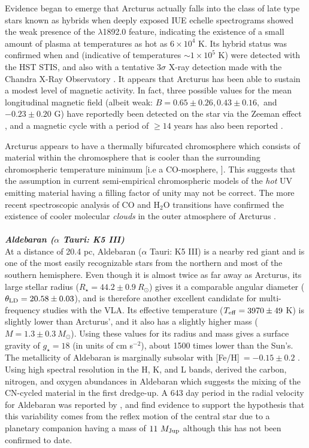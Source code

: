 Evidence began to emerge that Arcturus actually falls into the class of late type stars known as hybrids when deeply exposed IUE echelle spectrograms showed the weak presence of the \ion{Si}{iii]} $\lambda$1892.0 feature, indicating the existence of a small amount of plasma at temperatures as hot as $6 \times 10^4$ K. Its hybrid status was confirmed when  and  (indicative of temperatures $\sim 1 \times 10^5$ K) were detected with the HST STIS, and also with a tentative $3 \sigma$ X-ray detection made with the  Chandra X-Ray Observatory \citep{ayres_2003}. It appears that Arcturus has been able to sustain a modest level of magnetic activity. In fact, three possible values for the mean longitudinal magnetic field (albeit weak: $B = 0.65 \pm 0.26, 0.43 \pm 0.16,$ and $-0.23 \pm 0.20$ G) have reportedly been detected on the star via the Zeeman effect \citep{sennhauser_2011}, and a magnetic cycle with a period of $\geq 14$ years has also been reported \citep{brown_2008}.

Arcturus appears to have a thermally bifurcated chromosphere which consists of material within the chromosphere that is cooler than the surrounding chromospheric temperature minimum [i.e a CO-mosphere, \cite{wiedemann_1994}]. This suggests that the assumption in current semi-empirical chromospheric models of the \textit{hot} UV emitting material having a filling factor of unity may not be correct. The more recent spectroscopic analysis of CO and H$_{2}$O transitions have confirmed the existence of cooler molecular \textit{clouds} in the outer atmosphere of Arcturus \citep{ryde_2002,tsuji_2009}. 
\\
\\
\textbf{\textit{Aldebaran ($\alpha$ Tauri: K5 III)}}\\
At a distance of 20.4 pc, Aldebaran ($\alpha$ Tauri: K5 III) is a nearby red giant and is one of the most easily recognizable stars from the northern and most of the southern hemisphere. Even though it is almost twice as far away as Arcturus, its large stellar radius ($R_{\star}=44.2 \pm 0.9 \ R_{\odot}$) gives it a comparable angular diameter ($\theta _{\rm{LD}}=20.58\pm0.03$), and is therefore another excellent candidate for multi-frequency studies with the VLA. Its effective temperature ($T_{\rm{eff}}=3970 \pm 49$ K) is slightly lower than Arcturus', and it also has a slightly higher mass ($M=1.3 \pm 0.3 \ M_{\odot}$). Using these values for its radius and mass gives a surface gravity of $g_{\star}= 18$ (in units of cm s$^{-2}$), about 1500 times lower than the Sun's. The metallicity of Aldebaran is marginally subsolar with [Fe/H]$\ = - 0.15 \pm 0.2$ \citep{decin_2003}. Using high spectral resolution in the H, K, and L bands, \cite{tsuji_2008} derived the carbon, nitrogen, and oxygen abundances in Aldebaran which suggests the mixing of the CN-cycled material in the first dredge-up. A 643 day period in the radial velocity for Aldebaran was reported by \cite{hatzes_1993}, and \cite{hatzes_1998} find evidence to support the hypothesis that this variability comes from the reflex motion of the central star due to a planetary companion having a mass of $11 \ M_{\rm{Jup}}$ although this has not been confirmed to date.


